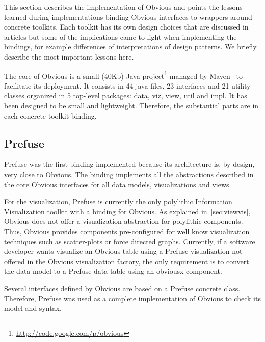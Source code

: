 This section describes the implementation of Obvious and points the
lessons learned during implementations binding Obvious interfaces to
wrappers around concrete toolkits.  Each toolkit has its own design
choices that are discussed in articles but some of the implications
came to light when implementing the bindings, for example differences
of interpretations of design patterns.  We briefly describe the most
important lessons here.

The core of Obvious is a small (40Kb) Java
project\footnote{\url{http://code.google.com/p/obvious}} managed by
Maven~\cite{Maven} to facilitate its deployment.  It consists in 44
java files, 23 interfaces and 21 utility classes organized in 5
top-level packages: data, viz, view, util and impl.  It has been
designed to be small and lightweight.  Therefore, the substantial
parts are in each concrete toolkit binding.

\subsection{Prefuse}

Prefuse was the first binding implemented because its architecture is,
by design, very close to Obvious.  The binding implements all the
abstractions described in the core Obvious interfaces for all data
models, visualizations and views.

For the visualization, Prefuse is currently the only polylithic
Information Visualization toolkit with a binding for Obvious.  As
explained in~\ref{sec:viewvis}, Obvious does not offer a visualization
abstraction for polylithic components.  Thus, Obvious provides
components pre-configured for well know visualization techniques such
as scatter-plots or force directed graphs.  Currently, if a software
developer wants visualize an Obvious table using a Prefuse
visualization not offered in the Obvious visualization factory, the
only requirement is to convert the data model to a Prefuse data table
using an obviousx component.  


Several interfaces defined by Obvious are based on a Prefuse concrete
class.  Therefore, Prefuse was used as a complete implementation of
Obvious to check its model and syntax.


